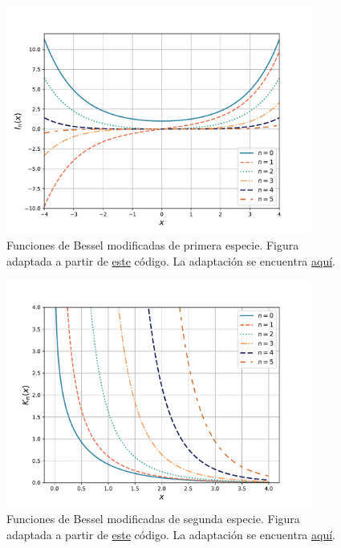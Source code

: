 \begin{figure}[htbp]
    \centering
    \includegraphics[width = 10cm]{Figuras/Bessel-modified-first-kind.pdf}
    \caption{Funciones de Bessel modificadas de primera especie. Figura adaptada a partir de \href{https://github.com/gfrubi/FM2/blob/master/figuras-editables/fig-Bessel.py}{este} código. La adaptación se encuentra \href{https://github.com/Pedroga-cc/Fisica-Matematica-II/blob/main/Figuras/Plotter_Bessel.py}{aquí}.}
    \label{fig:Bessel_modificada_primera}
\end{figure}

\begin{figure}[htbp]
    \centering
    \includegraphics[width = 10cm]{Figuras/Bessel-modified-second-kind.pdf}
    \caption{Funciones de Bessel modificadas de segunda especie. Figura adaptada a partir de \href{https://github.com/gfrubi/FM2/blob/master/figuras-editables/fig-Bessel.py}{este} código. La adaptación se encuentra \href{https://github.com/Pedroga-cc/Fisica-Matematica-II/blob/main/Figuras/Plotter_Bessel.py}{aquí}.}
    \label{fig:Bessel_modificada_segunda}
\end{figure}

